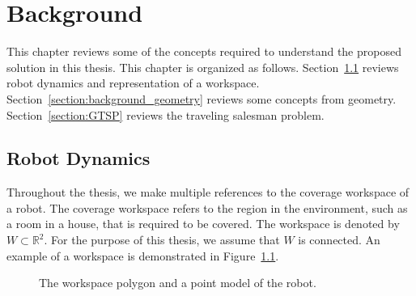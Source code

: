 \documentclass[../main.tex]{subfiles}
\begin{document}
\chapter{Background}
\label{chapter:background}

This chapter reviews some of the concepts required to understand the proposed solution in this thesis. This chapter is organized as follows. Section~\ref{section:background_robot_dynamics} reviews robot dynamics and representation of a workspace. Section~\ref{section:background_geometry} reviews some concepts from geometry. Section~\ref{section:GTSP} reviews the traveling salesman problem.

\section{Robot Dynamics}
\label{section:background_robot_dynamics}

Throughout the thesis, we make multiple references to the coverage workspace of a robot. The coverage workspace refers to the region in the environment, such as a room in a house, that is required to be covered. The workspace is denoted by $W\subset\mathbb{R}^2$. For the purpose of this thesis, we assume that $W$ is connected. An example of a workspace is demonstrated in Figure~\ref{fig:workspace_and_system}.

\begin{figure}
	\centering
	
	\caption{The workspace polygon and a point model of the robot.}
	\label{fig:workspace_and_system}
\end{figure}



\end{document}
